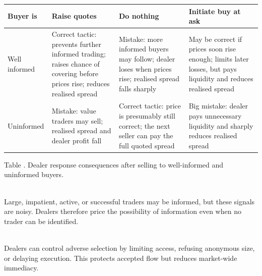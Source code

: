 \documentclass[a4paper,oneside,openany]{book}
\begin{document}
\begin{table}[htbp]
\centering
\scriptsize
{}
\renewcommand{\arraystretch}{1.13}
\setlength{\tabcolsep}{4pt}
\begin{tabularx}{\textwidth}{@{}>{\RaggedRight\arraybackslash}p{} >{\RaggedRight\arraybackslash}p{} >{\RaggedRight\arraybackslash}p{} >{\RaggedRight\arraybackslash}X@{}}
\hline
\textbf{Buyer is} & \textbf{Raise quotes} & \textbf{Do nothing} & \textbf{Initiate buy at ask} \\
\hline
Well informed & Correct tactic: prevents further informed trading; raises chance of covering before prices rise; reduces realised spread & Mistake: more informed buyers may follow; dealer loses when prices rise; realised spread falls sharply & May be correct if prices soon rise enough; limits later losses, but pays liquidity and reduces realised spread \\
\hline
Uninformed & Mistake: value traders may sell; realised spread and dealer profit fall & Correct tactic: price is presumably still correct; the next seller can pay the full quoted spread & Big mistake: dealer pays unnecessary liquidity and sharply reduces realised spread \\
\hline
\end{tabularx}

\vspace{0.25em}
{\footnotesize Table \thetable. Dealer response consequences after selling to well-informed and uninformed buyers.}
\end{table}

\begin{caveat} \\
Large, impatient, active, or successful traders may be informed, but these signals are noisy. Dealers therefore price the possibility of information even when no trader can be identified.
\end{caveat}

\begin{caveat} \\
Dealers can control adverse selection by limiting access, refusing anonymous size, or delaying execution. This protects accepted flow but reduces market-wide immediacy.
\end{caveat}

\end{document}
